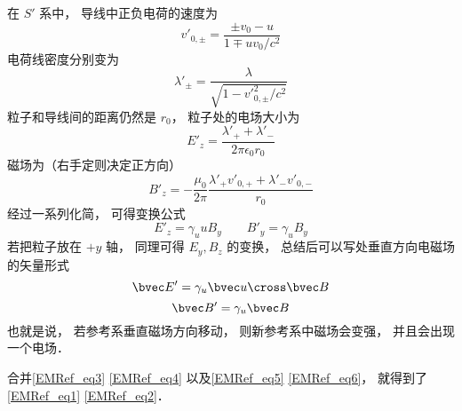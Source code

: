 在 $S'$ 系中， 导线中正负电荷的速度为
\begin{equation}
v'_{0, \pm} = \frac{\pm v_0-u}{1 \mp uv_0/c^2}
\end{equation}
电荷线密度分别变为
\begin{equation}
\lambda'_\pm = \frac{\lambda}{\sqrt{1 - v'^2_{0,\pm}/c^2}}
\end{equation}
粒子和导线间的距离仍然是 $r_0$， 粒子处的电场大小为
\begin{equation}
E'_z = \frac{\lambda'_+ + \lambda'_-}{2 \pi \epsilon_{0} r_0}
\end{equation}
磁场为（右手定则决定正方向）
\begin{equation}
B'_z = -\frac{\mu_0}{2\pi} \frac{\lambda'_+ v'_{0,+} + \lambda'_- v'_{0,-}}{r_0}
\end{equation}
经过一系列化简， 可得变换公式
\begin{equation}
E'_z = \gamma_u u B_y
\qquad
B'_y = \gamma_u B_y
\end{equation}
若把粒子放在 $+y$ 轴， 同理可得 $E_y, B_z$ 的变换， 总结后可以写处垂直方向电磁场的矢量形式
\begin{equation}\label{EMRef_eq3}
\bvec E' = \gamma_u \bvec u \cross \bvec B
\end{equation}
\begin{equation}\label{EMRef_eq4}
\bvec B' = \gamma_u \bvec B
\end{equation}
也就是说， 若参考系垂直磁场方向移动， 则新参考系中磁场会变强， 并且会出现一个电场．

合并\autoref{EMRef_eq3} \autoref{EMRef_eq4} 以及\autoref{EMRef_eq5} \autoref{EMRef_eq6}， 就得到了\autoref{EMRef_eq1} \autoref{EMRef_eq2}．

